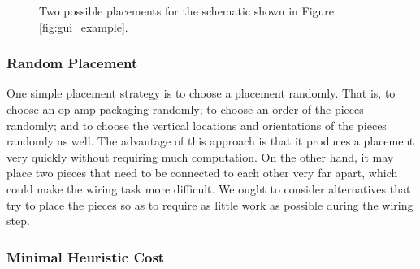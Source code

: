 \begin{figure}
\caption[Placement examples]{Two possible placements for the schematic shown in
Figure \ref{fig:gui_example}.}
\label{fig:sample_placements}
\end{figure}

\subsubsection{Random Placement}

One simple placement strategy is to choose a placement randomly.
That is, to choose
an op-amp packaging randomly; to choose an order of the pieces randomly; and to
choose the vertical locations and orientations of the pieces randomly as well.
The advantage of this
approach is that it produces a placement very quickly without requiring much
computation. On the other hand, it may place two pieces that need to be
connected to each other very far apart, which could make the wiring task more
difficult. We ought to consider alternatives that try to place the pieces so as
to require as little work as possible during the wiring step.

\subsubsection{Minimal Heuristic Cost}

